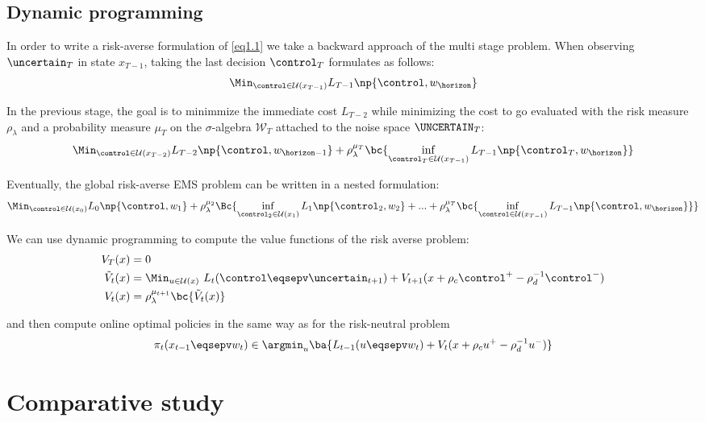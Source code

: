\documentclass[10pt,a4paper]{article}
\begin{document}
\subsection{Dynamic programming}

\noindent In order to write a risk-averse formulation of \eqref{eq1.1} we take a backward approach of the multi stage problem. When observing $\uncertain_T$ in state $x_{T-1}$, taking the last decision $\control_T$ formulates as follows:
\[ \Min_{\control \in \mathcal{U}(x_{T-1})} L_{T-1} \np{\control, w_\horizon} \]

\noindent In the previous stage, the goal is to minimmize the immediate cost $L_{T-2}$ while minimizing the cost to go evaluated with the risk measure $\rho_\lambda$ and a probability measure $\mu_T$ on the $\sigma$-algebra $\mathcal{W}_T$ attached to the noise space $\UNCERTAIN_T$:
\[ \Min_{\control \in \mathcal{U}(x_{T-2})} L_{T-2} \np{\control, w_{\horizon-1}} + \rho_\lambda^{\mu_T} \bc{\inf_{\control_T \in \mathcal{U}(x_{T-1})} L_{T-1} \np{\control_T, w_\horizon}}\]

\noindent Eventually,  the global risk-averse EMS problem can be written in a nested formulation:
\begin{equation} 
\Min_{\control \in \mathcal{U}(x_0)} L_0 \np{\control, w_1} + \rho_\lambda^{\mu_2} \Bc{ \inf_{\control_2 \in \mathcal{U}(x_1)} L_1 \np{\control_2, w_2} + ... + \rho_\lambda^{\mu_T} \bc{\inf_{\control \in \mathcal{U}(x_{T-1})} L_{T-1} \np{\control, w_\horizon}} }
\label{eq3.1}
\end{equation}

\noindent We can use dynamic programming to compute the value functions of the risk averse problem:
\begin{equation}
\begin{aligned}
V_T(x) &=  0  \\
\tilde{V}_t(x) &= \Min_{u \in \mathcal{U}(x)} \ L_t(\control \eqsepv \uncertain_{t+1}) + V_{t+1}(x + \rho_c \control^+ -\rho_d^{-1} \control^-) \\
V_t(x) &= \rho_\lambda^{\mu_{t+1}} \bc{\tilde{V}_t(x)} 
\end{aligned}
\label{eq3.2}
\end{equation}

\noindent and then compute online optimal policies in the same way as for the risk-neutral problem
\[ \pi_t(x_{t-1} \eqsepv w_t) \in \argmin_u{\ba{L_{t-1}(u \eqsepv w_t) + V_t(x + \rho_c u^+ - \rho^{-1}_d u^-)}} \]

\section{Comparative study}
\end{document}
